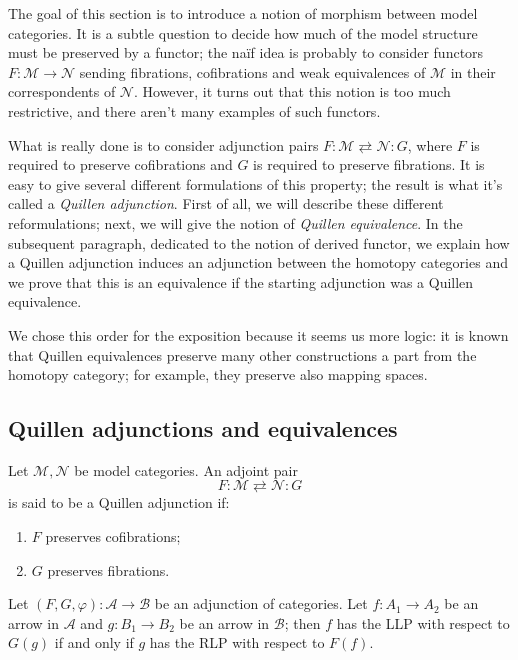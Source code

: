 \begin{refsection}
The goal of this section is to introduce a notion of morphism between model categories. It is a subtle question to decide how much of the model structure must be preserved by a functor; the na\"if idea is probably to consider functors $F \colon \mathcal M \to \mathcal N$ sending fibrations, cofibrations and weak equivalences of $\mathcal M$ in their correspondents of $\mathcal N$. However, it turns out that this notion is too much restrictive, and there aren't many examples of such functors.

What is really done is to consider adjunction pairs $F \colon \mathcal M \rightleftarrows \mathcal N \colon G$, where $F$ is required to preserve cofibrations and $G$ is required to preserve fibrations. It is easy to give several different formulations of this property; the result is what it's called a \emph{Quillen adjunction}. First of all, we will describe these different reformulations; next, we will give the notion of \emph{Quillen equivalence}. In the subsequent paragraph, dedicated to the notion of derived functor, we explain how a Quillen adjunction induces an adjunction between the homotopy categories and we prove that this is an equivalence if the starting adjunction was a Quillen equivalence.

We chose this order for the exposition because it seems us more logic: it is known that Quillen equivalences preserve many other constructions a part from the homotopy category; for example, they preserve also mapping spaces.

\subsection{Quillen adjunctions and equivalences}\label{subsec Quillen adjunction}

\begin{defin}
Let $\mathcal M, \mathcal N$ be model categories. An adjoint pair
\[
F \colon \mathcal M \rightleftarrows \mathcal N \colon G
\]
is said to be a Quillen adjunction if:
\begin{enumerate}
\item $F$ preserves cofibrations;
\item $G$ preserves fibrations.
\end{enumerate}
\end{defin}

\begin{lemma} \label{lemma adjunction and lifting properties}
Let $(F,G,\varphi) \colon \mathcal A \to \mathcal B$ be an adjunction of categories. Let $f \colon A_1 \to A_2$ be an arrow in $\mathcal A$ and $g \colon B_1 \to B_2$ be an arrow in $\mathcal B$; then $f$ has the LLP with respect to $G(g)$ if and only if $g$ has the RLP with respect to $F(f)$.
\end{lemma}


\end{refsection}
